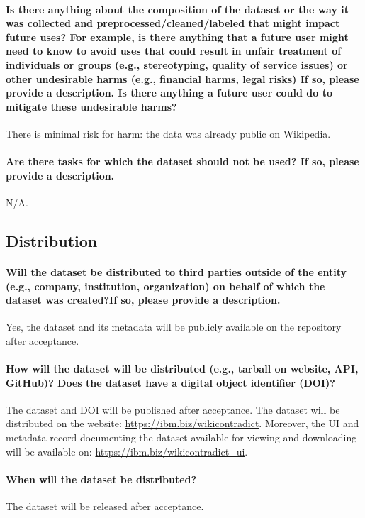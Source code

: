 \documentclass{article}
\begin{document}
\paragraph{Is there anything about the composition of the dataset or the way it was collected and preprocessed/cleaned/labeled that might impact future uses? For example, is there anything that a future user might need to know to avoid uses that could result in unfair treatment of individuals or groups (e.g., stereotyping, quality of service issues) or other undesirable harms (e.g., financial harms, legal risks) If so, please provide a description. Is there anything a future user could do to mitigate these undesirable harms?}
There is minimal risk for harm: the data was already public on Wikipedia.



\paragraph{Are there tasks for which the dataset should not be used? If so, please provide a description.}
N/A.


\subsection{Distribution}
\paragraph{Will the dataset be distributed to third parties outside of the entity (e.g., company, institution,
organization) on behalf of which the dataset was created?If so, please provide a description.}
Yes, the dataset and its metadata will be publicly available on the repository after acceptance.

\paragraph{How will the dataset will be distributed (e.g., tarball on website, API, GitHub)? Does the dataset
have a digital object identifier (DOI)?}
The dataset and DOI will be published after acceptance. The dataset will be distributed on the website: \url{https://ibm.biz/wikicontradict}. %
Moreover, the UI and metadata record documenting the dataset available for viewing and downloading will be available on: \url{https://ibm.biz/wikicontradict_ui}.


\paragraph{When will the dataset be distributed?}
The dataset will be released after acceptance.
\end{document}
